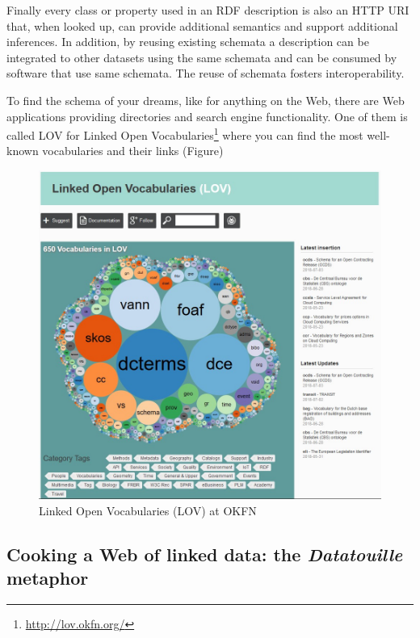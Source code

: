 Finally every class or property used in an RDF description is also an
HTTP URI that, when looked up, can provide additional semantics and
support additional inferences. In addition, by reusing existing schemata
a description can be integrated to other datasets using the same
schemata and can be consumed by software that use same schemata. The
reuse of schemata fosters interoperability.

To find the schema of your dreams, like for anything on the Web, there
are Web applications providing directories and search engine
functionality. One of them is called LOV for Linked Open
Vocabularies\footnote{\url{http://lov.okfn.org/}} where you can find the
most well-known vocabularies and their links (Figure)

\begin{figure}
    \centering
\includegraphics[width=5.0in]{media/ch5/figure-05-12.jpg}
    \caption{Linked Open Vocabularies (LOV) at OKFN}
    \label{fig:ch5.12}
\end{figure}

\hypertarget{cooking-a-web-of-linked-data-the-datatouille-metaphor}{%
\subsection{\texorpdfstring{Cooking a Web of linked data: the
\emph{Datatouille}
metaphor}{Cooking a Web of linked data: the Datatouille metaphor}}\label{cooking-a-web-of-linked-data-the-datatouille-metaphor}}

